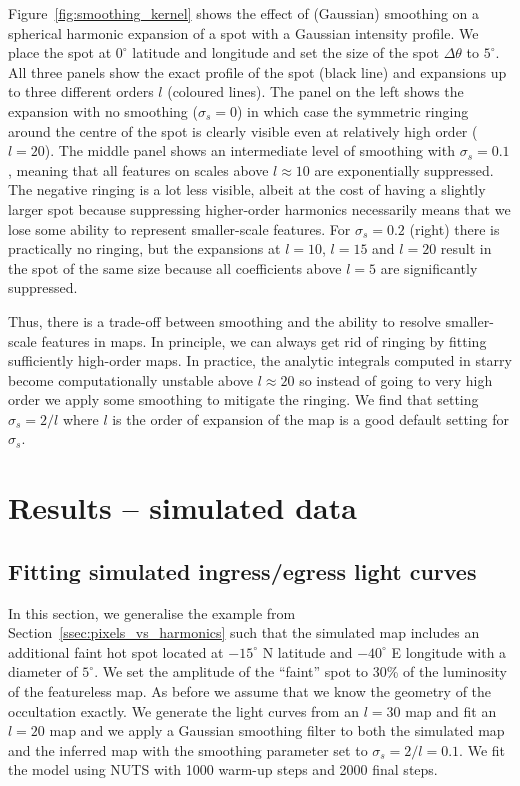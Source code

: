 \documentclass[12pt,dvipsnames]{report}
\begin{document}
Figure~\ref{fig:smoothing_kernel} shows the effect of (Gaussian) smoothing on a spherical harmonic expansion of a spot with a Gaussian intensity profile.
We place the spot at $0^\circ$ latitude and longitude and set the size of the spot $\Delta\theta$ to $5^\circ$.
All three panels show the exact profile of the spot (black line) and expansions up to three different orders $l$ (coloured lines).
The panel on the left shows the expansion with no smoothing ($\sigma_s=0$) in which case the symmetric ringing around the centre of the spot is clearly visible even at relatively high order ($l=20$).
The middle panel shows an intermediate level of smoothing with $\sigma_s=0.1$, meaning that all features on scales above $l\approx 10$ are exponentially suppressed.
The negative ringing is a lot less visible, albeit at the cost of having a slightly larger spot because suppressing higher-order harmonics necessarily means that we lose some ability to represent smaller-scale features.
For $\sigma_s=0.2$ (right) there is practically no ringing, but the expansions at $l=10$, $l=15$ and $l=20$ result in the spot of the same size because all coefficients above $l=5$ are significantly suppressed.

Thus, there is a trade-off between smoothing and the ability to resolve smaller-scale features
in maps. 
In principle, we can always get rid of ringing by fitting sufficiently high-order maps.
In practice, the analytic integrals computed in \textsf{starry} become computationally unstable above $l\approx 20$ so instead of going to very high order we apply some smoothing to mitigate the ringing.
We find that setting $\sigma_s=2/l$ where $l$ is the order of expansion of the map  is a good default setting for $\sigma_s$.

\section{Results -- simulated data}
\label{sec:io_results_sim}
\subsection{Fitting simulated ingress/egress light curves}
\label{ssec:fitting_sim_ingress_egress}
In this section, we generalise the example from Section~\ref{ssec:pixels_vs_harmonics} such that the simulated map includes an additional faint hot spot located at $-15^\circ$ N latitude and $-40^\circ$ E longitude with a diameter of $5^\circ$.
We set the amplitude of the ``faint'' spot to 30\% of the luminosity of the featureless map.
As before we assume that we know the geometry of the occultation exactly.
We generate the light curves from an $l=30$ map and fit an $l=20$ map and we apply a Gaussian smoothing filter to both the simulated map and the inferred map with the smoothing parameter set to $\sigma_s=2/l=0.1$.
We fit the model using NUTS with 1000 warm-up steps and 2000 final steps. 
\end{document}
